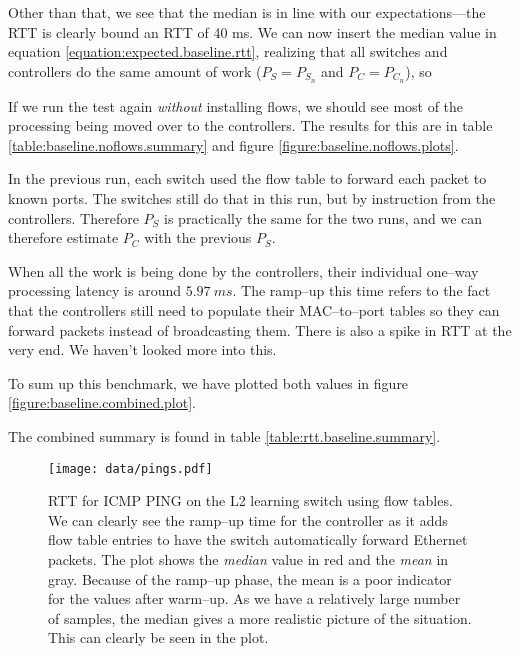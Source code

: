 Other than that, we see that the median is in line with our
expectations---the RTT is clearly bound an RTT of 40 ms.  We can now insert
the median value in equation \ref{equation:expected.baseline.rtt},
realizing that all switches and controllers do the same amount of work
($P_S = P_{S_n}$ and $P_C = P_{C_n}$), so
%


If we run the test again \textit{without} installing flows, we should see
most of the processing being moved over to the controllers. The results for
this are in table \ref{table:baseline.noflows.summary} and figure
\ref{figure:baseline.noflows.plots}.

In the previous run, each switch used the flow table to forward each packet
to known ports.  The switches still do that in this run, but by instruction
from the controllers.  Therefore $P_S$ is practically the same for the two
runs, and we can therefore estimate $P_C$ with the previous $P_S$.



When all the work is being done by the controllers, their individual
one--way processing latency is around $5.97~ms$.  The ramp--up this time
refers to the fact that the controllers still need to populate their
MAC--to--port tables so they can forward packets instead of broadcasting
them.  There is also a spike in RTT at the very end.  We haven't looked more
into this.




To sum up this benchmark, we have plotted both values in figure
\ref{figure:baseline.combined.plot}.

The combined summary is found in table \ref{table:rtt.baseline.summary}.



\begin{figure}[H]
  \centering
  \texttt{[image: data/pings.pdf]}
  \caption{\acs{RTT} for ICMP PING on the L2 learning switch using flow tables.
           We can clearly see the ramp--up time for the controller as it
           adds flow table entries to have the switch automatically forward
           Ethernet packets. The plot shows the \textit{median} value in red
  and the \textit{mean} in gray.  Because of the ramp--up phase, the mean is a poor
  indicator for the values after warm--up.  As we have a relatively large
  number of samples, the median gives a more realistic picture of the
  situation.  This can clearly be seen in the plot.}
  \label{benchmark:l2.learning.switch.ping}
\end{figure}

